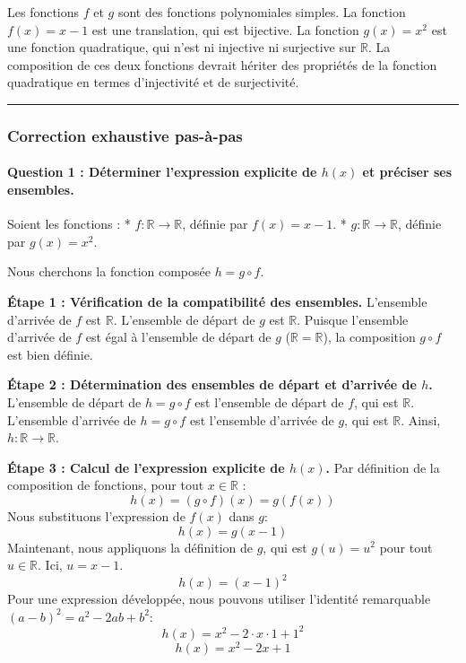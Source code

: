 \documentclass[12pt,a4paper]{report}
\begin{document}
Les fonctions \(f\) et \(g\) sont des fonctions polynomiales simples. La
fonction \(f(x) = x-1\) est une translation, qui est bijective. La
fonction \(g(x) = x^2\) est une fonction quadratique, qui n'est ni
injective ni surjective sur \(\mathbb{R}\). La composition de ces deux
fonctions devrait hériter des propriétés de la fonction quadratique en
termes d'injectivité et de surjectivité.

\begin{center}\rule{0.5\linewidth}{0.5pt}\end{center}

\subsubsection{Correction exhaustive
pas-à-pas}\label{correction-exhaustive-pas-uxe0-pas}

\paragraph{\texorpdfstring{Question 1 : Déterminer l'expression
explicite de \(h(x)\) et préciser ses
ensembles.}{Question 1 : Déterminer l'expression explicite de h(x) et préciser ses ensembles.}}\label{question-1-duxe9terminer-lexpression-explicite-de-hx-et-pruxe9ciser-ses-ensembles.}

Soient les fonctions : * \(f: \mathbb{R} \to \mathbb{R}\), définie par
\(f(x) = x-1\). * \(g: \mathbb{R} \to \mathbb{R}\), définie par
\(g(x) = x^2\).

Nous cherchons la fonction composée \(h = g \circ f\).

\textbf{Étape 1 : Vérification de la compatibilité des ensembles.}
L'ensemble d'arrivée de \(f\) est \(\mathbb{R}\). L'ensemble de départ
de \(g\) est \(\mathbb{R}\). Puisque l'ensemble d'arrivée de \(f\) est
égal à l'ensemble de départ de \(g\) (\(\mathbb{R} = \mathbb{R}\)), la
composition \(g \circ f\) est bien définie.

\textbf{Étape 2 : Détermination des ensembles de départ et d'arrivée de
\(h\).} L'ensemble de départ de \(h = g \circ f\) est l'ensemble de
départ de \(f\), qui est \(\mathbb{R}\). L'ensemble d'arrivée de
\(h = g \circ f\) est l'ensemble d'arrivée de \(g\), qui est
\(\mathbb{R}\). Ainsi, \(h: \mathbb{R} \to \mathbb{R}\).

\textbf{Étape 3 : Calcul de l'expression explicite de \(h(x)\).} Par
définition de la composition de fonctions, pour tout
\(x \in \mathbb{R}\) : \[h(x) = (g \circ f)(x) = g(f(x))\] Nous
substituons l'expression de \(f(x)\) dans \(g\): \[h(x) = g(x-1)\]
Maintenant, nous appliquons la définition de \(g\), qui est
\(g(u) = u^2\) pour tout \(u \in \mathbb{R}\). Ici, \(u = x-1\).
\[h(x) = (x-1)^2\] Pour une expression développée, nous pouvons utiliser
l'identité remarquable \((a-b)^2 = a^2 - 2ab + b^2\):
\[h(x) = x^2 - 2 \cdot x \cdot 1 + 1^2\] \[h(x) = x^2 - 2x + 1\]
\end{document}
